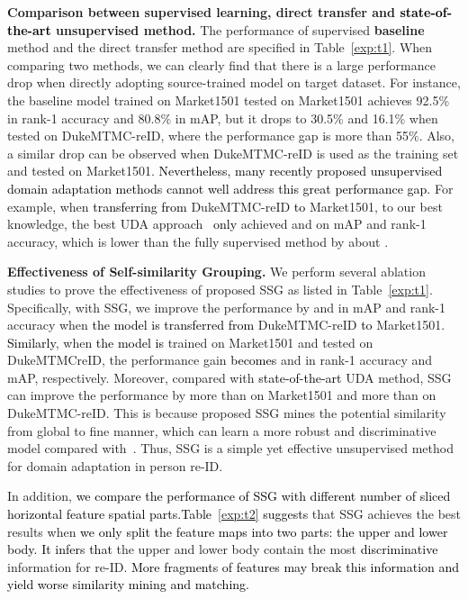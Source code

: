 \documentclass[10pt,twocolumn,letterpaper]{article}
\newcommand{\re}{\textcolor{black}}
\begin{document}
{\bf Comparison between supervised learning, direct transfer and \re{state-of-the-art} unsupervised method.} The performance of supervised {\bf baseline} method and the direct transfer method are specified in Table~\ref{exp:t1}. When comparing two methods, we can clearly find that there is a large performance drop when directly adopting source-trained model on target dataset. For instance, the baseline model trained on Market1501 tested on Market1501 achieves 92.5\% in rank-1 accuracy and 80.8\% in mAP, but it drops to 30.5\% and 16.1\% when tested on DukeMTMC-reID, where the performance gap is more than 55\%. Also, a similar drop can be observed when DukeMTMC-reID is used as the training set and tested on Market1501. 
\re{Nevertheless, many recently proposed unsupervised domain adaptation methods cannot well address this great performance gap.} For example, when \re{transferring from} DukeMTMC-reID \re{to} Market1501, to our best knowledge, the best UDA approach~\cite{deng2018image} \re{only} achieved  and  on mAP and rank-1 accuracy, which is lower than the fully supervised method by about .

{\bf Effectiveness of Self-similarity Grouping.} We perform several ablation studies to prove the effectiveness of proposed SSG as listed in Table~\ref{exp:t1}. Specifically, with SSG, we improve the performance by  and  in mAP and rank-1 accuracy when \re{the model is transferred from} DukeMTMC-reID \re{to} Market1501. \re{Similarly}, when \re{the model is} trained on Market1501 and tested on DukeMTMCreID, the performance gain \re{becomes}  and  in rank-1 accuracy and mAP, respectively. Moreover, compared with \re{state-of-the-art} UDA method, SSG can improve the performance by more than  on Market1501 and more than  on DukeMTMC-reID. This is because proposed SSG mines the potential similarity from global to fine manner, which can learn a more robust and discriminative model compared with~\cite{deng2018image}. Thus, SSG is a simple yet effective unsupervised method for domain adaptation in person re-ID. 


In addition, \re{we compare the performance of SSG with different number of \re{sliced} horizontal feature spatial parts.}\re{Table~\ref{exp:t2} suggests} that SSG achieves the best results when \re{we only split the feature maps into two parts: the upper and lower body.} 
\re{It infers that} the upper and lower body contain the most \re{discriminative} information for re-ID. \re{More fragments of features may break this information and yield worse similarity mining and matching.} 
\end{document}
